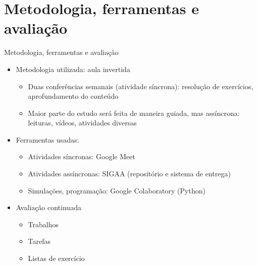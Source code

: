   \section[ slide = true]{Metodologia, ferramentas e avaliação}
      \begin{slide}[toc=]{Metodologia, ferramentas e avaliação}
         \begin{itemize}
	    \item Metodologia utilizada: aula invertida  
		    \begin{itemize}
			    \item Duas conferências semanais (atividade síncrona): resolução de exercícios, aprofundamento do conteúdo
			    \item Maior parte do estudo será feita de maneira guiada, mas assíncrona: leituras, vídeos, atividades diversas
		    \end{itemize}
	    \item Ferramentas usadas:
		    \begin{itemize}
			    \item Atividades síncronas: Google Meet 
			    \item Atividades assíncronas: SIGAA (repositório e sistema de entrega)
			    \item Simulações, programação: Google Colaboratory (Python)
		    \end{itemize}

            \item Avaliação continuada
            \begin{itemize}
               \item Trabalhos 
               \item Tarefas 
	       \item Listas de exercício
	    \end{itemize}
	 \end{itemize}
      \end{slide}


